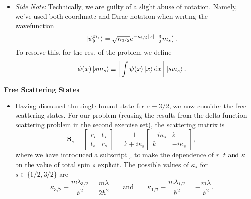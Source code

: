 \documentclass[11pt, a4paper]{article}
\newcommand{\diff}{\mathop{}\!\mathrm{d}} %
\newcommand{\eqtext}[1]{\qquad \text{#1} \qquad}
\newcommand{\mat}[1]{\mathbf{#1}} %
\begin{document}
\begin{itemize}
	\item \textit{Side Note}: Technically, we are guilty of a slight abuse of notation. Namely, we've used both coordinate and Dirac notation when writing the wavefunction
	\begin{equation*}
		\ket{\psi_{0}^{m_{s}}} = \sqrt{\kappa_{3/2}}e^{-\kappa_{3/2}\abs{x}} \ket{\tfrac{3}{2}m_{s}}.
	\end{equation*}
	To resolve this, for the rest of the problem we define 
	\begin{equation*}
		\psi(x)\ket{sm_{s}} \equiv \left[\int \psi(x) \ket{x} \diff x \right] \ket{sm_{s}}.
	\end{equation*}
\end{itemize}

\textbf{Free Scattering States}
\begin{itemize}	
	\item Having discussed the single bound state for $ s = 3/2 $, we now consider the free scattering states. For our problem (reusing the results from the delta function scattering problem in the second exercise set), the scattering matrix is
	\begin{equation*}
		\mat{S}_{s} = 
		\begin{bmatrix}
			r_{s} & t_{s}\\
			t_{s} & r_{s}
		\end{bmatrix}
		= 
		\frac{1}{k + i \kappa_{s}}
		\begin{bmatrix}
			-i\kappa_{s} & k\\
			k & -i \kappa_{s}
		\end{bmatrix},
	\end{equation*}
	where we have introduced a subscript $ _{s} $ to make the dependence of $ r $, $ t $ and $ \kappa $ on the value of total spin $ s $ explicit. The possible values of $ \kappa_{s} $ for $ s \in \{1/2, 3/2\} $ are
	\begin{equation*}
		\kappa_{3/2} \equiv \frac{m\lambda_{3/2}}{\hbar^{2}} = \frac{m\lambda}{2\hbar^{2}} \eqtext{and} \kappa_{1/2} \equiv \frac{m\lambda_{1/2}}{\hbar^{2}} = - \frac{m\lambda}{\hbar^{2}}.
	\end{equation*}
	

\end{itemize}
\end{document}
